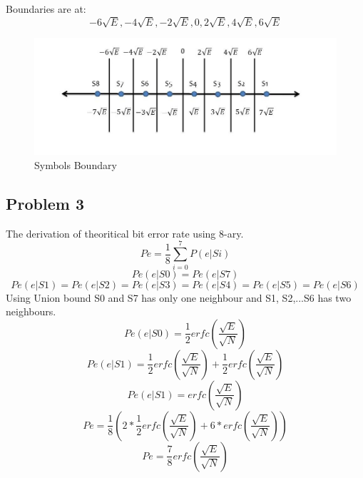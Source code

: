 \documentclass[a4paper,12pt]{report}
\begin{document}
        Boundaries are at:
        \begin{equation*}
            -6 \sqrt{E}, -4 \sqrt{E}, -2 \sqrt{E}, 0, 2 \sqrt{E}, 4 \sqrt{E}, 6 \sqrt{E}
        \end{equation*}
        \vspace{-1cm}
        \begin{figure}[h!]
            \includegraphics[width=\linewidth]{Figures/Figure_2.jpg}
            \caption{Symbols Boundary}
            \label{fig:Symbols}
        \end{figure}

    \vspace{1cm}

    \subsection{Problem 3}
        The derivation of theoritical bit error rate using 8-ary.
        \begin{equation}
            Pe = \frac{1}{8} \displaystyle\sum_{i=0}^{7} P(e|Si) 
        \end{equation}
        \begin{equation}
            Pe(e|S0) = Pe(e|S7)
        \end{equation}
        \begin{equation}
            Pe(e|S1) = Pe(e|S2) = Pe(e|S3) = Pe(e|S4) = Pe(e|S5) = Pe(e|S6)
        \end{equation}
        Using Union bound S0 and S7 has only one neighbour and S1, S2,...S6 has two neighbours.
        \begin{equation}
            Pe(e|S0) = \frac{1}{2} erfc(\frac{\sqrt{E}}{\sqrt{N}})
        \end{equation}
        \begin{equation}
            Pe(e|S1) = \frac{1}{2} erfc(\frac{\sqrt{E}}{\sqrt{N}})
                + \frac{1}{2} erfc(\frac{\sqrt{E}}{\sqrt{N}})
        \end{equation}
        \begin{equation}
            Pe(e|S1) = erfc(\frac{\sqrt{E}}{\sqrt{N}})
        \end{equation}
        \begin{equation}
            Pe = \frac{1}{8} (2 * \frac{1}{2} erfc(\frac{\sqrt{E}}{\sqrt{N}}) 
                + 6 * erfc(\frac{\sqrt{E}}{\sqrt{N}}))
        \end{equation}
        \begin{equation}
            Pe = \frac{7}{8} erfc(\frac{\sqrt{E}}{\sqrt{N}}) 
        \end{equation}
\end{document}
